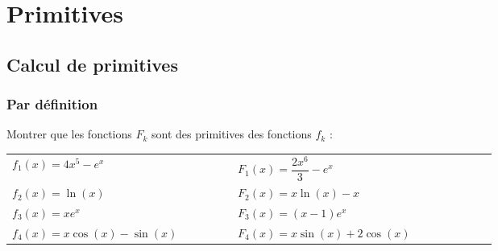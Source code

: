 \documentclass[oneside,12pt]{book}          %
\begin{document}

\chapter{Primitives}
\newpage

\section{Calcul de primitives}

\subsection{Par définition}
Montrer que les fonctions $F_k$ sont des primitives des fonctions $f_k$ :

\begin{tabular}{p{0.3\linewidth}p{0.4\linewidth}}
$f_1(x) = 4x^5 - e^x$ & $F_1(x) = \dfrac{2x^6}{3} - e^x$ \\
$f_2(x) = \ln(x)$ & $F_2(x) = x \ln(x) - x$ \\
$f_3(x) = xe^x$ &  $F_3(x) = (x-1)e^x$ \\
$f_4(x) = x \cos(x) - \sin(x)$ &  $F_4(x) = x \sin(x) + 2 \cos(x)$
\end{tabular}
\end{document}
